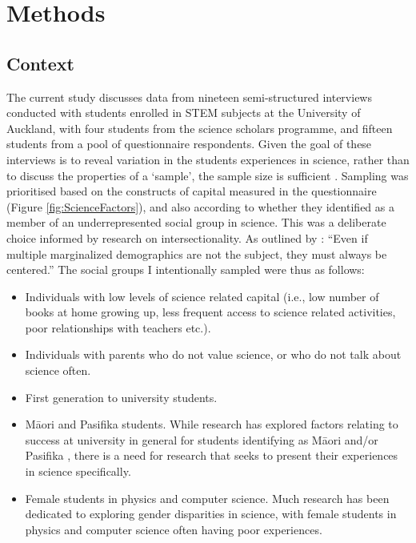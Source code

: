 \section{Methods}

\subsection{Context}
The current study discusses data from nineteen semi-structured interviews conducted with students enrolled in STEM subjects at the University of Auckland, with four students from the science scholars programme, and fifteen students from a pool of questionnaire respondents. Given the goal of these interviews is to reveal variation in the students experiences in science, rather than to discuss the properties of a `sample', the sample size is sufficient \cite{berglund2006students}. Sampling was prioritised based on the constructs of capital measured in the questionnaire (Figure \ref{fig:ScienceFactors}), and also according to whether they identified as a member of an underrepresented social group in science. This was a deliberate choice informed by research on intersectionality. As outlined by \cite{duran2019using}: ``Even if multiple marginalized demographics are not the subject, they must always be centered.'' The social groups I intentionally sampled were thus as follows:
\begin{itemize}
    \item Individuals with low levels of science related capital (i.e., low number of books at home growing up, less frequent access to science related activities, poor relationships with teachers etc.).
    \item Individuals with parents who do not value science, or who do not talk about science often.
    \item First generation to university students. 
    \item M\={a}ori and Pasifika students. While research has explored factors relating to success at university in general for students identifying as M\={a}ori and/or Pasifika \citep{mayeda2014you}, there is a need for research that seeks to present their experiences in science specifically. 
    \item Female students in physics and computer science. Much research has been dedicated to exploring gender disparities in science, with female students in physics and computer science often having poor experiences. 
\end{itemize}
